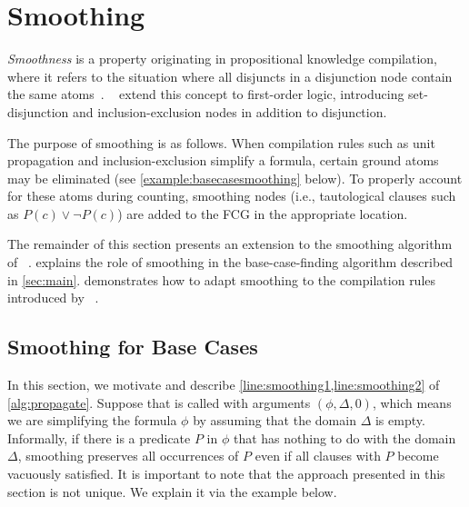 \documentclass[letterpaper]{article} %
\theoremstyle{remark}
\theoremstyle{definition}
\begin{document}
\section{Smoothing}\label{sec:smoothing}

\emph{Smoothness} is a property originating in propositional knowledge
compilation, where it refers to the situation where all disjuncts in a
disjunction node contain the same atoms~\cite{darwiche2001tractable}.
\citeauthor{DBLP:conf/ijcai/BroeckTMDR11}~
extend this concept to first-order logic, introducing set-disjunction and
inclusion-exclusion nodes in addition to disjunction.

The purpose of smoothing is as follows. When compilation rules such as unit
propagation and inclusion-exclusion simplify a formula, certain ground atoms may
be eliminated (see \cref{example:basecasesmoothing} below). To properly account
for these atoms during counting, smoothing nodes (i.e., tautological clauses
such as $P(c) \lor \neg P(c)$) are added to the FCG in the appropriate location.

The remainder of this section presents an extension to the smoothing algorithm
of
\citeauthor{DBLP:conf/ijcai/BroeckTMDR11}~.
 explains the role of smoothing in the base-case-finding
algorithm described in \cref{sec:main}.  demonstrates
how to adapt smoothing to the compilation rules introduced by
\citeauthor{DBLP:conf/kr/DilkasB23}~.

\subsection{Smoothing for Base Cases}\label{sec:smoothingbase}

In this section, we motivate and describe \cref{line:smoothing1,line:smoothing2}
of \cref{alg:propagate}. Suppose that \Propagate is called with arguments
$(\phi, \Delta, 0)$, which means we are simplifying the formula $\phi$ by
assuming that the domain $\Delta$ is empty. Informally, if there is a predicate
$P$ in $\phi$ that has nothing to do with the domain $\Delta$, smoothing
preserves all occurrences of $P$ even if all clauses with $P$ become vacuously
satisfied. It is important to note that the approach presented in this section
is not unique. We explain it via the example below.
\end{document}
